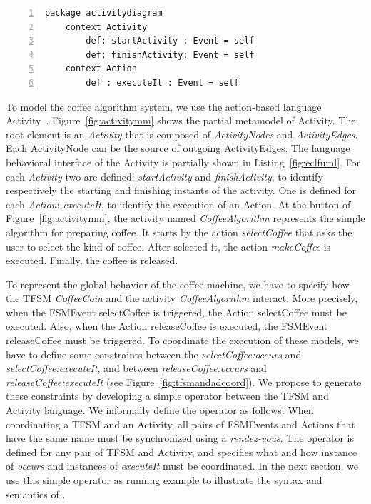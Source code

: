 	\begin{lstlisting}[language=ecl,
	caption={Partial \ecl specification of Activity Diagram},
	label={fig:eclfuml}, 
	basicstyle=\scriptsize\ttfamily, backgroundcolor=\color{LGrey}, numbers=left, xleftmargin=3pt, belowskip=-0.4em]
	package activitydiagram
	context Activity
		def: startActivity : Event = self
		def: finishActivity: Event = self
	context Action
		def : executeIt : Event = self
	\end{lstlisting}
To model the coffee algorithm system, we use the action-based language Activity~\cite{ttc15bib}. Figure~\ref{fig:activitymm} shows the partial metamodel of Activity. The root element is an \emph{Activity} that is composed of \emph{ActivityNodes} and \emph{ActivityEdges}. Each ActivityNode can be the source of outgoing ActivityEdges. The language behavioral interface of the Activity is partially shown in Listing~\ref{fig:eclfuml}. For each \emph{Activity} two \dse are defined: \emph{startActivity} and \emph{finishActivity}, to identify respectively the starting and finishing instants of the activity. One \dse is defined for each \emph{Action}: \emph{executeIt}, to identify the execution of an Action. At the button of Figure~\ref{fig:activitymm}, the activity named \emph{CoffeeAlgorithm} represents the simple algorithm for preparing coffee. It starts by the action \emph{selectCoffee} that asks the user to select the kind of coffee. After selected it, the action \emph{makeCoffee} is executed. Finally, the coffee is released.

To represent the global behavior of the coffee machine, we have to specify how the TFSM \emph{CoffeeCoin} and the activity \emph{CoffeeAlgorithm} interact. More precisely, when the FSMEvent selectCoffee is triggered, the Action selectCoffee must be executed. Also, when the Action releaseCoffee is executed, the FSMEvent releaseCoffee must be triggered. To coordinate the execution of these models, we have to define some constraints between the \mse \emph{selectCoffee:occurs} and \emph{selectCoffee:executeIt}, and between \emph{releaseCoffee:occurs} and \emph{releaseCoffee:executeIt} (see Figure~\ref{fig:tfsmandadcoord}). We propose to generate these constraints by developing a simple \bcool operator between the TFSM and Activity language. We informally define the operator as follows: When coordinating a TFSM and an Activity, all pairs of FSMEvents and Actions that have the same name must be synchronized using a \emph{rendez-vous}. The operator is defined for any pair of TFSM and Activity, and specifies what and how instance of \dse \emph{occurs} and instances of \dse \emph{executeIt} must be coordinated. In the next section, we use this simple operator as running example to illustrate the syntax and semantics of \bcool.  


